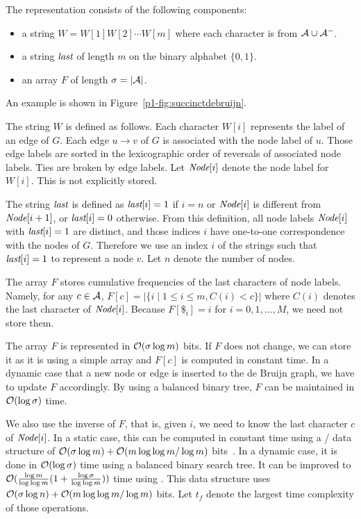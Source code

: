 The representation consists of the following components:
\begin{itemize}
\item a string $W = W[1] W[2] \cdots W[m]$ where each character is from ${\cal A} \cup {\cal A}^-$.
\item a string ${\textit{last}}$ of length $m$ on the binary alphabet $\{0,1\}$.
\item an array $F$ of length $\sigma = |{\cal A}|$.
\end{itemize}
An example is shown in Figure~\ref{p1-fig:succinctdebruijn}.

The string $W$ is defined as follows.
Each character $W[i]$ represents the label of an edge of $G$.
Each edge $u \rightarrow v$ of $G$ is associated with the node label of $u$.
Those edge labels are sorted in the lexicographic order of reversals of associated node labels.
Ties are broken by edge labels.
Let ${\textit{Node}}[i]$ denote the node label for $W[i]$.  This is not explicitly stored.

The string ${\textit{last}}$ is defined as
${\textit{last}}[i] = 1$ if $i = n$ or ${\textit{Node}}[i]$ is different from ${\textit{Node}}[i+1]$,
or ${\textit{last}}[i] = 0$ otherwise.  From this definition,
all node labels ${\textit{Node}}[i]$ with ${\textit{last}}[i] = 1$ are distinct, and
those indices $i$ have one-to-one correspondence with the nodes of $G$.
Therefore we use an index $i$ of the strings such that ${\textit{last}}[i] = 1$
to represent a node $v$.  
Let $n$ denote the number of nodes.

The array $F$ stores cumulative frequencies of the last characters of node labels.
Namely, for any $c \in {\cal A}$, 
$F[c] = |\{i \mid 1 \le i \le m, C(i) < c  \}|$
where $C(i)$ denotes the last character of ${\textit{Node}}[i]$.
Because $F[\$_i] = i$ for $i = 0,1,\ldots,M$, we need not store them.

The array $F$ is represented in $\mathcal{O}(\sigma \log m)$ bits.
If $F$ does not change, we can store it as it is using a simple array and $F[c]$ is computed
in constant time.
In a dynamic case that a new node or edge is inserted to the de Bruijn graph,
we have to update $F$ accordingly.  By using a balanced binary tree, $F$ can be maintained
in $\mathcal{O}(\log \sigma)$ time.

We also use the inverse of $F$, that is, given $i$, we need to know the last character $c$
of ${\textit{Node}}[i]$.  In a static case, this can be
computed in constant time using a {\rank}/{\select} data structure of
$\mathcal{O}(\sigma \log m) + \mathcal{O}(m \log\log m/\log m)$ bits~\cite{RRR07}.
In a dynamic case, it is done in $\mathcal{O}(\log \sigma)$ time using a balanced
binary search tree.
%
It can be improved to $\mathcal{O}(\frac{\log m }{\log \log m}
(1+\frac{\log\sigma}{\log\log m}))$ time using \cite{NavSad10}.
This data structure uses
$\mathcal{O}(\sigma \log n) + \mathcal{O}(m \log \log m/\log m)$ bits.
%
Let $t_f$ denote the largest time complexity of those operations.


